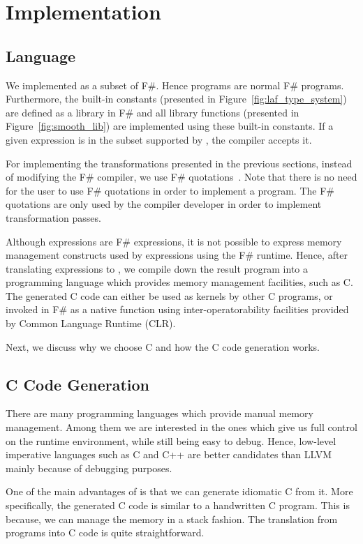 \section{Implementation}
\label{sec:impl}
\subsection{\lafsharp{} Language}
We implemented \lafsharp{} as a subset of F\#. Hence \lafsharp{} programs are normal F\# programs. Furthermore, the built-in constants (presented in Figure~\ref{fig:laf_type_system}) are defined as a library in F\# and all library functions (presented in Figure~\ref{fig:smooth_lib}) are implemented using these built-in constants. If a given expression is in the subset supported by \lafsharp{}, the compiler accepts it.

For implementing the transformations presented in the previous sections, instead of modifying the F\# compiler, we use F\# quotations~\cite{fsharpquotation}. Note that there is no need for the user to use F\# quotations in order to implement a \lafsharp{} program. The F\# quotations are only used by the compiler developer in order to implement transformation passes.

Although \lafsharp{} expressions are F\# expressions, it is not possible to express memory management constructs used by \salafsharp{} expressions using the F\# runtime. Hence, after translating \lafsharp{} expressions to \salafsharp{}, we compile down the result program into a programming language which provides memory management facilities, such as C. 
The generated C code can either be used as kernels by other C programs, or invoked in F\# as a native function using inter-operatorability facilities
provided by Common Language Runtime (CLR).

Next, we discuss why we choose C and how the C code generation works.
\subsection{C Code Generation}
\label{sec:ccodegen}
There are many programming languages which provide manual memory management. Among them we are interested in the ones which give us full control on the runtime environment, while still being easy to debug. Hence, low-level imperative languages such as C and C++ are better candidates than LLVM mainly because of debugging purposes.

One of the main advantages of \salafsharp{} is that we can generate idiomatic C from it. More specifically, the generated C code is similar to a handwritten C program. This is because, we can manage the memory in a stack fashion. The translation from \salafsharp{} programs into C code is quite straightforward.

